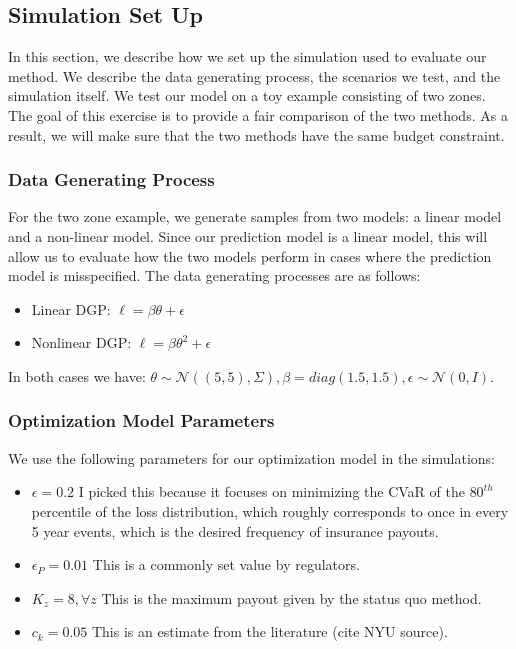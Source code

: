 \documentclass[11pt]{article}
\begin{document}
  \subsection{Simulation Set Up}
   In this section, we describe how we set up the simulation used to evaluate our method. We describe the data generating process, the scenarios we test, and the simulation itself. We test our model on a toy example consisting of two zones. The goal of this exercise is to provide a fair comparison of the two methods. As a result, we will make sure that the two methods have the same budget constraint.
    \subsubsection{Data Generating Process}
    For the two zone example, we generate samples from two models: a linear model and a non-linear model. Since our prediction model is a linear model, this will allow us to evaluate how the two models perform in cases where the prediction model is misspecified. The data generating processes are as follows: 
      \begin{itemize}
        \item Linear DGP: $\ell = \beta \theta + \epsilon$
        \item Nonlinear DGP: $\ell = \beta \theta^2 + \epsilon$
      \end{itemize}

    In both cases we have: $\theta \sim \mathcal{N}((5,5),\Sigma), \beta = diag(1.5,1.5), \epsilon \sim \mathcal{N}(0,I)$. 

    \subsubsection{Optimization Model Parameters}
      We use the following parameters for our optimization model in the simulations:

      \begin{itemize}
        \item $\epsilon=0.2$ I picked this because it focuses on minimizing the CVaR of the $80^{th}$ percentile of the loss distribution, which roughly corresponds to once in every 5 year events, which is the desired frequency of insurance payouts.  
        \item $\epsilon_P=0.01$ This is a commonly set value by regulators.
        \item $K_z = 8, \forall z$ This is the maximum payout given by the status quo method.  
        \item $c_k=0.05$ This is an estimate from the literature (cite NYU source). 
    \end{itemize}
\end{document}
